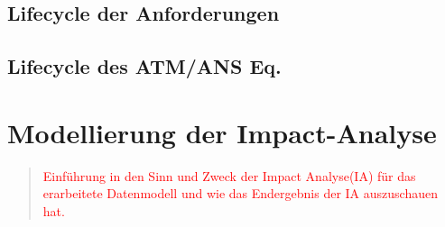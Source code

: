 \subsection{Lifecycle der Anforderungen}
\subsection{Lifecycle des ATM/ANS Eq.}

\pagebreak
\section{Modellierung der Impact-Analyse}


\begin{quote}
\textcolor{red}{Einführung in den Sinn und Zweck der Impact Analyse(IA) für das erarbeitete Datenmodell und wie das Endergebnis der IA auszuschauen hat.}
\end{quote}